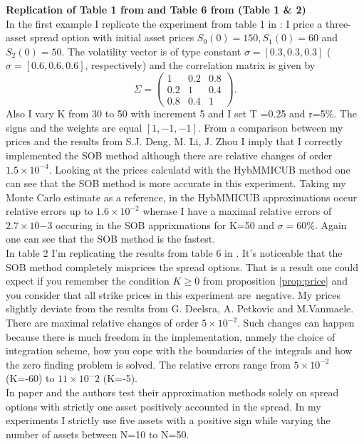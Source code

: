 \documentclass[a4paper]{article}
\begin{document}
{
\textbf{Replication of Table 1 from \cite{sob} and Table 6 from \cite{hybmmicub} (Table 1 \& 2)}\\
}
In the first example I replicate the experiment from table 1 in \cite{sob}: I price a three-asset spread option with initial asset prices $S_0(0)=150, S_1(0) = 60$ and $S_2(0) = 50.$ The volatility vector is of type constant $\sigma = [0.3, 0.3, 0.3]$ ($\sigma = [0.6, 0.6, 0.6]$, respectively) and the correlation matrix is given by 
$$\Sigma =\begin{pmatrix}1 & 0.2 & 0.8\\ 
0.2 & 1 & 0.4\\
0.8 & 0.4 & 1 \end{pmatrix}.$$
Also I vary K from 30 to 50 with increment 5 and I set T =0.25 and r=5\%. The signs and the weights are equal $[1,-1,-1]$. From a comparison between my prices and the results from S.J. Deng, M. Li, J. Zhou I imply that I correctly implemented the SOB method although there are relative changes of order $1.5\times10^{-4}$. Looking at the prices calculatd with the HybMMICUB method one can see that the SOB method is more accurate in this experiment. Taking my Monte Carlo estimate as a reference, in the HybMMICUB approximations occur relative errors up to $1.6 \times 10^{-2}$ wherase I have a maximal relative errors of $2.7\times10{-3}$ occuring in the SOB apprixmations for K=50 and $\sigma = 60\%$. Again one can see that the SOB method is the fastest.\\
In table 2 I'm replicating the results from table 6 in \cite{hybmmicub}. It's noticeable that the SOB method completely misprices the spread options. That is a result one could expect if you remember the condition $K\geq0$ from proposition \ref{prop:price} and you consider that all strike prices in this experiment are\ negative. My prices slightly deviate from the results from G. Deelsra, A. Petkovic and M.Vanmaele. There are maximal relative changes of order $5\times10^{-2}$. Such changes can happen because there is much freedom in the implementation, namely the choice of integration scheme, how you cope with the boundaries of the integrals and how the zero finding problem is solved. The relative errors range from $5\times10^{-2}$ (K=-60) to $11\times10^-{2}$ (K=-5).\\
In paper \cite{sob} and \cite{hybmmicub} the authors test their approximation methods solely on spread options with strictly one asset positively accounted in the spread. In my experiments I strictly use five assets with a positive sign while varying the number of assets between N=10 to N=50.\\
\end{document}
